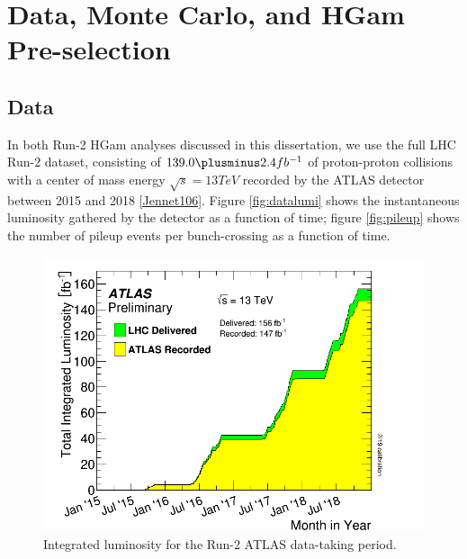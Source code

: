 \section{Data, Monte Carlo, and HGam Pre-selection} \label{sec:DataMC}

\subsection{Data} \label{sec:Data}

In both Run-2 HGam analyses discussed in this dissertation, we use the full LHC Run-2 dataset, consisting of $139.0 \plusminus 2.4 fb^{-1}$ of proton-proton collisions with a center of mass energy $\sqrt{s} = 13 TeV$ recorded by the ATLAS detector between 2015 and 2018 \ref{Jennet106}. Figure \ref{fig:datalumi} shows the instantaneous luminosity gathered by the detector as a function of time; figure \ref{fig:pileup} shows the number of pileup events per bunch-crossing as a function of time. 

\begin{figure}
\includegraphics[width=\linewidth]{figures/datamc_chapter/datalumi.png}
\caption{Integrated luminosity for the Run-2 ATLAS data-taking period.}
\end{figure}

